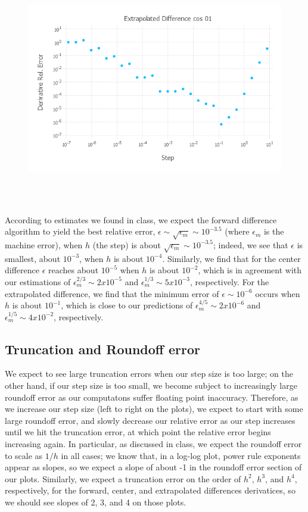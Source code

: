 \documentclass{article}
\begin{document}
\begin{figure}[H]
	\includegraphics[width=6in,height=4in]{"extrap cos 01"}
\end{figure}
According to estimates we found in class, we expect the forward difference algorithm to yield the best relative error, $\epsilon \sim \sqrt{\epsilon_m} \sim 10^{-3.5}$ (where $\epsilon_m$ is the machine error), when $h$ (the step) is about $\sqrt{\epsilon_m} \sim 10^{-3.5}$; indeed, we see that $\epsilon$ is smallest, about $10^{-3}$, when $h$ is about $10^{-4}$. Similarly, we find that for the center difference $\epsilon$ reaches about $10^{-5}$ when $h$ is about $10^{-2}$, which is in agreement with our estimations of $\epsilon_m^{2/3} \sim 2x10^{-5}$ and $\epsilon_m^{1/3} \sim 5x10^{-3}$, respectively. For the extrapolated difference, we find that the minimum error of $\epsilon \sim 10^{-6}$ occurs when $h$ is about $10^{-1}$, which is close to our predictions of $\epsilon_m^{4/5} \sim 2x10^{-6}$ and $\epsilon_m^{1/5} \sim 4x10^{-2}$, respectively.

\subsection{Truncation and Roundoff error}
We expect to see large truncation errors when our step size is too large; on the other hand, if our step size is too small, we become subject to increasingly large roundoff error as our computatons suffer floating point inaccuracy. Therefore, as we increase our step size (left to right on the plots), we expect to start with some large roundoff error, and slowly decrease our relative error as our step increases until we hit the truncation error, at which point the relative error begins increasing again. In particular, as discussed in class, we expect the roundoff error to scale as $1/h$ in all cases; we know that, in a log-log plot, power rule exponents appear as slopes, so we expect a slope of about -1 in the roundoff error section of our plots. Similarly, we expect a truncation error on the order of $h^2$, $h^3$, and $h^4$, respectively, for the forward, center, and extrapolated differences derivatices, so we should see slopes of 2, 3, and 4 on those plots.
\end{document}
